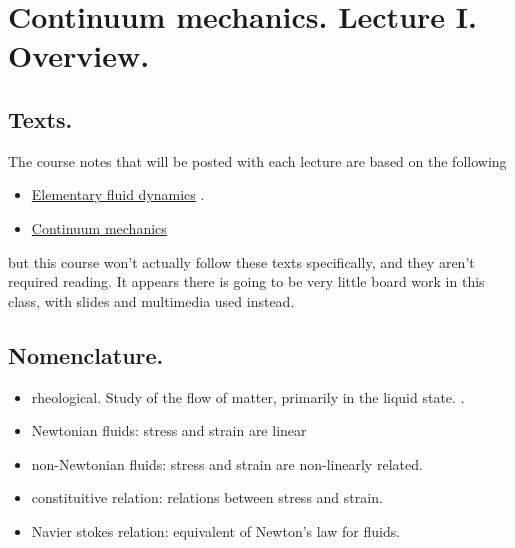 
%

\chapter{Continuum mechanics.  Lecture I.  Overview.}
\label{chap:continuumL1}
{}
\date{Jan 11, 2012}

\beginArtWithToc

\section{Texts.}

The course notes that will be posted with each lecture are based on the following

\begin{itemize}
\item \href{http://www.amazon.com/Elementary-Dynamics-Applied-Mathematics-Computing/dp/0198596790/ref=sr_1_1?ie=UTF8&qid=1326302753&sr=8-1}{Elementary fluid dynamics} \cite{acheson1990elementary}.
\item \href{http://www.amazon.com/Theory-Elasticity-Third-Theoretical-Physics/dp/075062633X/ref=sr_1_6?s=books&ie=UTF8&qid=1326302957&sr=1-6}{Continuum mechanics} \cite{landau1960theory}
\end{itemize}


but this course won't actually follow these texts specifically, and they aren't required reading.  It appears there is going to be very little board work in this class, with slides and multimedia used instead.

\section{Nomenclature.}

\begin{itemize}
\item rheological.  Study of the flow of matter, primarily in the liquid state.  \cite{wiki:rheology}.
\item Newtonian fluids: stress and strain are linear
\item non-Newtonian fluids: stress and strain are non-linearly related.
\item constituitive relation: relations between stress and strain.
\item Navier stokes relation: equivalent of Newton's law for fluids.
\end{itemize}

\EndArticle
